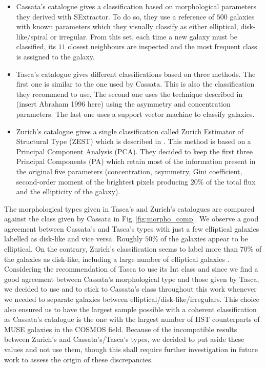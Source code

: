\begin{itemize}
	\item Cassata's catalogue gives a classification based on morphological parameters they derived with SExtractor. To do so, they use a reference of $500$ galaxies with known parameters which they visually classify as either elliptical, disk-like/spiral or irregular. From this set, each time a new galaxy must be classified, its $11$ closest neighbours are inspected and the most frequent class is assigned to the galaxy.
	
	\item Tasca's catalogue gives different classifications based on three methods. The first one is similar to the one used by Cassata. This is also the classification they recommend to use. The second one uses the technique described in (insert Abraham 1996 here) using the asymmetry and concentration parameters. The last one uses a support vector machine to classify galaxies.
	
	\item Zurich's catalogue gives a single classification called Zurich Estimator of Structural Type (ZEST) which is described in . This method is based on a Principal Component Analysis (PCA). They decided to keep the first three Principal Components (PA) which retain most of the information present in the original five parameters (concentration, asymmetry, Gini coefficient, second-order moment of the brightest pixels producing $20\%$ of the total flux and the ellipticity of the galaxy).
\end{itemize}

The morphological types given in Tasca's and Zurich's catalogues are compared against the class given by Cassata in Fig.\,\ref{fig:morpho_comp}. We observe a good agreement between Cassata's and Tasca's types with just a few elliptical galaxies labelled as disk-like and vice versa. Roughly $50\%$ of the galaxies appear to be elliptical. On the contrary, Zurich's classification seems to label more than $70\%$ of the galaxies as disk-like, including a large number of elliptical galaxies .\\

Considering the recommendation of Tasca to use its Int class and since we find a good agreement between Cassata's morphological type and those given by Tasca, we decided to use and to stick to Cassata's class throughout this work whenever we needed to separate galaxies between elliptical/disk-like/irregulars. This choice also ensured us to have the largest sample possible with a coherent classification as Cassata's catalogue is the one with the largest number of HST counterparts of MUSE galaxies in the COSMOS field. Because of the incompatible results between Zurich's and Cassata's/Tasca's types, we decided to put aside these values and not use them, though this shall require further investigation in future work to assess the origin of these discrepancies.

